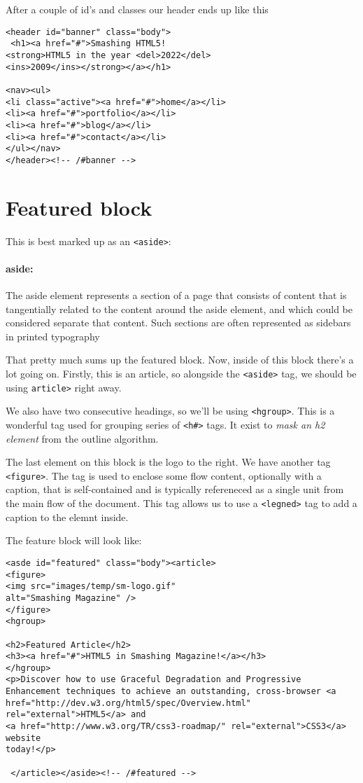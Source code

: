 \documentclass[a4paper, 12pt]{book}
\begin{document}
After a couple of id's and classes our header ends up like this
\begin{verbatim}
<header id="banner" class="body">
 <h1><a href="#">Smashing HTML5! 
<strong>HTML5 in the year <del>2022</del> 
<ins>2009</ins></strong></a></h1> 

<nav><ul>
<li class="active"><a href="#">home</a></li> 
<li><a href="#">portfolio</a></li>
<li><a href="#">blog</a></li>
<li><a href="#">contact</a></li>
</ul></nav>
</header><!-- /#banner -->
\end{verbatim}
\section{Featured block}
This is best marked up as an \verb|<aside>|:
\paragraph{aside:} The aside element represents a section of a page that
consists of content that is tangentially related to the content around the aside
element, and which could be considered separate that content. Such sections are
often represented as sidebars in printed typography

That pretty much sums up the featured block.  Now, inside of this block there's
a lot going on. Firstly, this is an article, so alongside the \verb|<aside>|
tag, we should be using \verb|article>| right away.

We also have two consecutive headings, so we'll be using \verb|<hgroup>|. This
is a wonderful tag used for grouping series of \verb|<h#>| tags. It exist to
\emph{mask an h2 element} from the outline algorithm.

The last element on this block is the logo to the right. We have another
tag \verb|<figure>|. The tag is used to enclose some flow content, optionally
with a caption, that is self-contained and is typically refereneced as a single
unit from the main flow of the document. This tag allows us to use a
\verb|<legned>| tag to add a caption to the elemnt inside.

The feature block will look like:
\begin{verbatim}
<asde id="featured" class="body"><article>
<figure>
<img src="images/temp/sm-logo.gif"
alt="Smashing Magazine" />
</figure>
<hgroup> 

<h2>Featured Article</h2> 
<h3><a href="#">HTML5 in Smashing Magazine!</a></h3>
</hgroup> 
<p>Discover how to use Graceful Degradation and Progressive
Enhancement techniques to achieve an outstanding, cross-browser <a
href="http://dev.w3.org/html5/spec/Overview.html" rel="external">HTML5</a> and
<a href="http://www.w3.org/TR/css3-roadmap/" rel="external">CSS3</a> website
today!</p> 

 </article></aside><!-- /#featured -->
\end{verbatim}
\end{document}
